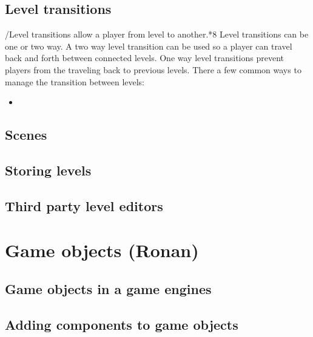\documentclass{article} %
\begin{document}
\subsection{Level transitions}
/Level transitions allow a player from level to another.*8
Level transitions can be one or two way.
A two way level transition can be used so a player can travel back and forth between connected levels.
One way level transitions prevent players from the traveling back to previous levels.
There a few common ways to manage the transition between levels:
\begin {itemize}
	\item
\end{itemize}
\subsection{Scenes}
\subsection{Storing levels}
\subsection{Third party level editors}

\section{Game objects (Ronan)}
\subsection{Game objects in a game engines}
\subsection{Adding components to game objects}

\newpage
\end{document}
